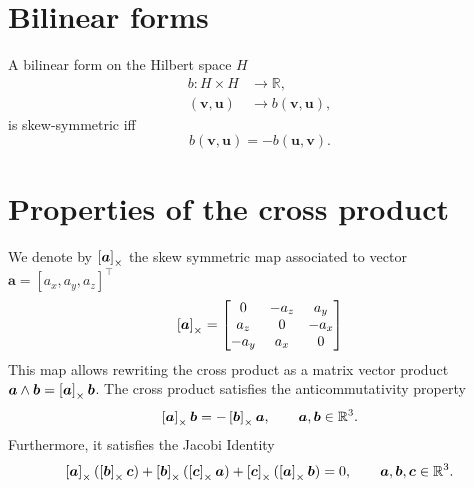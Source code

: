 \begin{theorem}
\end{theorem}

\section{Bilinear forms}
	
\begin{definition}\label{def:sk_bilinear}
A bilinear form on the Hilbert space $H$
\begin{equation*}
\begin{aligned}
b: H \times H &\longrightarrow \mathbb{R}, \\
(\bm{v}, \bm{u}) &\longrightarrow b(\bm{v}, \bm{u}),
\end{aligned}
\end{equation*}
is skew-symmetric iff
\begin{equation*}
b(\bm{v}, \bm{u}) = - b(\bm{u}, \bm{v}).
\end{equation*}
\end{definition}

\section{Properties of the cross product}\label{sec:crossprod}
We denote by $\left[\bm{a}\right]_\times$ the skew symmetric map associated to vector $\bm{a} = [a_x, a_y, a_z]^\top$
\begin{equation}
\left[\bm{a}\right]_\times = 
\begin{bmatrix}
0 & -a_z & a_y \\
a_z & 0 & -a_x \\
-a_y & a_x & 0 \\
\end{bmatrix}
\end{equation}
This map allows rewriting the cross product as a matrix vector product $\bm{a}\wedge \bm{b} = \left[\bm{a}\right]_\times\bm{b}$. The cross product satisfies the anticommutativity property
\begin{equation}
\label{eq:anticom}
\left[\bm{a}\right]_\times \bm{b} = - \left[\bm{b}\right]_\times \bm{a}, \qquad \bm{a}, \bm{b} \in \mathbb{R}^3.
\end{equation}
Furthermore, it satisfies the Jacobi Identity
\begin{equation}
\label{eq:jacobi}
\left[\bm{a}\right]_\times (\left[\bm{b}\right]_\times \bm{c}) + \left[\bm{b}\right]_\times (\left[\bm{c}\right]_\times \bm{a}) + \left[\bm{c}\right]_\times (\left[\bm{a}\right]_\times \bm{b}) = 0, \qquad \bm{a}, \bm{b}, \bm{c} \in \mathbb{R}^3.
\end{equation}


